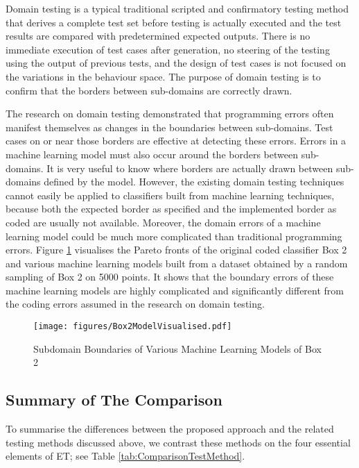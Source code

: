 \documentclass[preprint,1p,authoryear,times]{elsarticle}
\begin{document}
Domain testing is a typical traditional scripted and confirmatory testing method that derives a complete test set before testing is actually executed and the test results are compared with predetermined expected outputs. There is no immediate execution of test cases after generation, no steering of the testing using the output of previous tests, and the design of test cases is not focused on the variations in the behaviour space. The purpose of domain testing is to confirm that the borders between sub-domains are correctly drawn. 

The research on domain testing demonstrated that programming errors often manifest themselves as changes in the boundaries between sub-domains. Test cases on or near those borders are effective at detecting these errors. Errors in a machine learning model must also occur around the borders between sub-domains. It is very useful to know where borders are actually drawn between sub-domains defined by the model. However, the existing domain testing techniques cannot easily be applied to classifiers built from machine learning techniques, because both the expected border as specified and the implemented border as coded are usually not available. Moreover, the domain errors of a machine learning model could be much more complicated than traditional programming errors. Figure \ref{fig:MLModels} visualises the Pareto fronts of the original coded classifier Box 2 and various machine learning models built from a dataset obtained by a random sampling of Box 2 on 5000 points. It shows that the boundary errors of these machine learning models are highly complicated and significantly different from the coding errors assumed in the research on domain testing. 

\begin{figure}[hbtp]
	\centering
	\texttt{[image: figures/Box2ModelVisualised.pdf]}
	\caption{Subdomain Boundaries of Various Machine Learning Models of Box 2}
	\label{fig:MLModels}
\end{figure}

\subsection{Summary of The Comparison}

To summarise the differences between the proposed approach and the related testing methods discussed above, we contrast these methods on the four essential elements of ET; see Table \ref{tab:ComparisonTestMethod}. 
\end{document}
